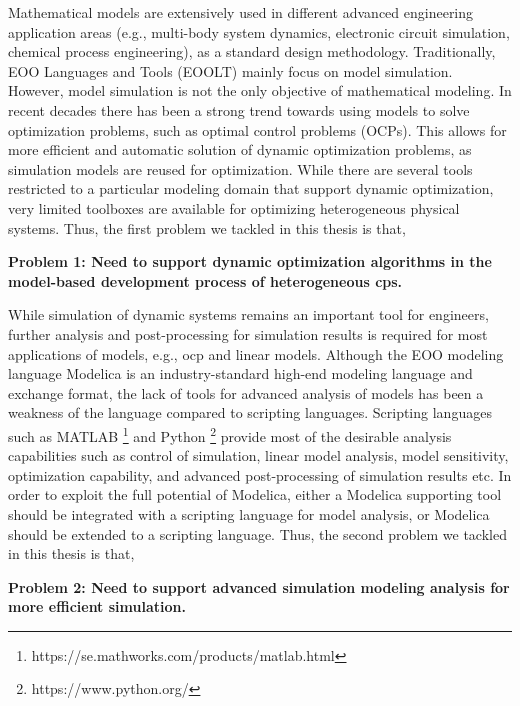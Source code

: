 Mathematical models are extensively used in different advanced engineering application areas (e.g., multi-body system dynamics, electronic circuit simulation, chemical process engineering), as a standard design methodology. Traditionally, EOO Languages and Tools (EOOLT) mainly focus on model simulation. However, model simulation is not the only objective of mathematical modeling. In recent decades there has been a strong trend towards using models to solve optimization problems, such as optimal control problems (OCPs). This allows for more efficient and automatic solution of dynamic optimization problems, as simulation models are reused for optimization. While there are several tools restricted to a particular modeling domain that support dynamic optimization, very limited toolboxes are available for optimizing heterogeneous physical systems. Thus, the first problem we tackled in this thesis is that, 

\begin{description}
	
\item \textbf{Problem 1: Need to support dynamic optimization algorithms in the model-based development process of heterogeneous \acrshort{cps}.}

\end{description}

While simulation of dynamic systems remains an important tool for engineers, further analysis and post-processing for simulation results is required for most applications of models, e.g., \acrshort{ocp} and linear models. Although the EOO modeling language Modelica is an industry-standard high-end modeling language and exchange format, the lack of tools for advanced analysis of models has been a weakness of the language compared to scripting languages. Scripting languages such as MATLAB \footnote{https://se.mathworks.com/products/matlab.html} and Python \footnote{https://www.python.org/} provide most of the desirable analysis capabilities such as control of simulation, linear model analysis, model sensitivity, optimization capability, and advanced post-processing of simulation results etc. In order to exploit the full potential of Modelica, either a Modelica supporting tool should be integrated with a scripting language for model analysis, or Modelica should be extended to a scripting language. Thus, the second problem we tackled in this thesis is that,

\begin{description}

\item \textbf{Problem 2: Need to support advanced simulation modeling analysis for more efficient simulation.}

\end{description}

